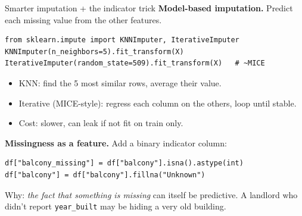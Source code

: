 \documentclass[aspectratio=169]{beamer}
\begin{document}
\begin{frame}[fragile]{Smarter imputation + the indicator trick}
  \textbf{Model-based imputation.} Predict each missing value from the other features.
\begin{lstlisting}
from sklearn.impute import KNNImputer, IterativeImputer
KNNImputer(n_neighbors=5).fit_transform(X)
IterativeImputer(random_state=509).fit_transform(X)   # ~MICE
\end{lstlisting}
  \begin{itemize}\small
    \item KNN: find the 5 most similar rows, average their value.
    \item Iterative (MICE-style): regress each column on the others, loop until stable.
    \item Cost: slower, can leak if not fit on train only.
  \end{itemize}
  \vfill
  \textbf{Missingness as a feature.} Add a binary indicator column:
\begin{lstlisting}
df["balcony_missing"] = df["balcony"].isna().astype(int)
df["balcony"] = df["balcony"].fillna("Unknown")
\end{lstlisting}
  Why: \emph{the fact that something is missing} can itself be predictive. A landlord who didn't report \texttt{year\_built} may be hiding a very old building.
\end{frame}
\end{document}
